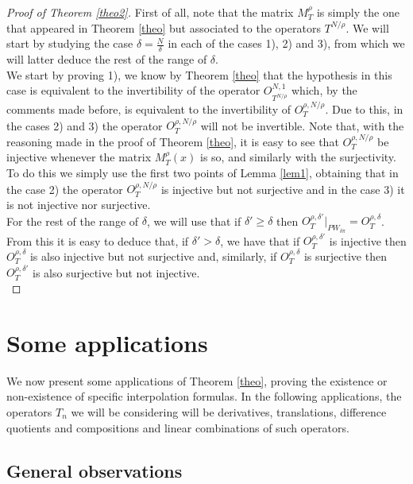 \documentclass[reqno]{amsart}
\theoremstyle{plain}
\theoremstyle{definition}
\numberwithin{equation}{section}
\begin{document}
\begin{proof}[Proof of Theorem \ref{theo2}]
	First of all, note that the matrix $M^{\rho}_T$ is simply the one that appeared in Theorem \ref{theo} but associated to the operators $T^{N/\rho}$. We will start by studying the case $\delta=\frac{N}{\delta}$ in each of the cases 1), 2) and 3), from which we will latter deduce the rest of the range of $\delta$. \\
    
    We start by proving 1), we know by Theorem \ref{theo} that the hypothesis in this case is equivalent to the invertibility of the operator $O^{N,1}_{T^{N/\rho}}$ which, by the comments made before, is equivalent to the invertibility of $O^{\rho,N/\rho}_T$. Due to this, in the cases 2) and 3) the operator $O^{\rho,N/\rho}_T$ will not be invertible. Note that, with the reasoning made in the proof of Theorem \ref{theo}, it is easy to see that $O^{\rho,N/\rho}_T$ be injective whenever the matrix $M^\rho_T(x)$ is so, and similarly with the surjectivity. To do this we simply use the first two points of Lemma \ref{lem1}, obtaining that in the case 2) the operator $O^{\rho,N/\rho}_T$ is injective but not surjective and in the case 3) it is not injective nor surjective. \\
    
    For the rest of the range of $\delta$, we will use that if $\delta'\geq \delta$ then $O^{\rho,\delta'}_T\vert_{PW_{\delta\pi}}=O^{\rho,\delta}_T$. From this it is easy to deduce that, if $\delta'>\delta$, we have that if $O^{\rho,\delta'}_T$ is injective then $O^{\rho,\delta}_T$ is also injective but not surjective and, similarly, if $O^{\rho,\delta}_T$ is surjective then $O^{\rho,\delta'}_T$ is also surjective but not injective. \\
\end{proof}


\section{Some applications}

We now present some applications of Theorem \ref{theo}, proving the existence or non-existence of specific interpolation formulas. In the following applications, the operators $T_n$ we will be considering will be derivatives, translations, difference quotients and compositions and linear combinations of such operators.

\subsection{General observations}
\end{document}
